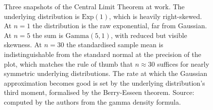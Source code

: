 \begin{figure}[htbp]
\caption[Central Limit Theorem convergence]{Three snapshots of the
Central Limit Theorem at work. The underlying distribution is
$\mathrm{Exp}(1)$, which is heavily right-skewed. At $n = 1$ the
distribution is the raw exponential, far from Gaussian. At $n = 5$
the sum is $\mathrm{Gamma}(5, 1)$, with reduced but visible
skewness. At $n = 30$ the standardised sample mean is
indistinguishable from the standard normal at the precision of the
plot, which matches the rule of thumb that $n \approx 30$ suffices
for nearly symmetric underlying distributions. The rate at which
the Gaussian approximation becomes good is set by the underlying
distribution's third moment, formalised by the Berry-Esseen
theorem. Source: computed by the authors from the gamma density
formula.}
\label{fig:vol02:ch13:clt-convergence}
\end{figure}
